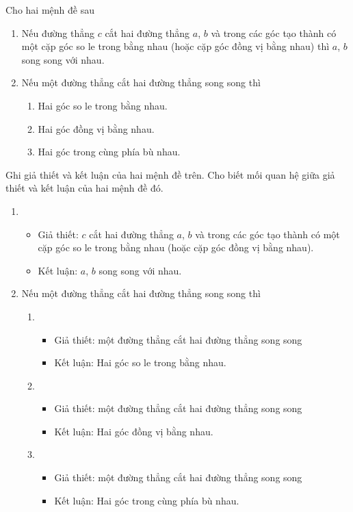 \begin{bt}%
Cho hai mệnh đề sau
	\begin{enumerate}
		\item Nếu đường thẳng $c$ cắt hai đường thẳng $a$, $b$ và trong các góc tạo thành có một cặp góc so le trong bằng nhau (hoặc cặp góc đồng vị bằng nhau) thì $a$, $b$ song song với nhau.
		\item Nếu một đường thẳng cắt hai đường thẳng song song thì 
			\begin{enumerate}[1.]
				\item Hai góc so le trong bằng nhau.
				\item Hai góc đồng vị  bằng nhau.
				\item Hai góc trong cùng phía bù nhau.
			\end{enumerate}
	\end{enumerate}
Ghi giả thiết và kết luận của hai mệnh đề trên. Cho biết mối quan hệ giữa  giả thiết và kết luận của hai mệnh đề đó.
	\loigiai
	{\begin{enumerate}
			\item 
			\begin{itemize}
			\item  Giả thiết: $c$ cắt hai đường thẳng $a$, $b$ và trong các góc tạo thành có một cặp góc so le trong bằng nhau (hoặc cặp góc đồng vị bằng nhau).
			\item Kết luận: $a$, $b$ song song với nhau. 
			\end{itemize}
			\item Nếu  một đường thẳng cắt hai đường thẳng song song thì 
			\begin{enumerate}[1.]
				\item 	
				\begin{itemize}
					\item  Giả thiết: một đường thẳng cắt hai đường thẳng song song 
					\item Kết luận: Hai góc so le trong bằng nhau.
				\end{itemize}
				\item 	
				\begin{itemize}
					\item  Giả thiết: một đường thẳng cắt hai đường thẳng song song 
					\item Kết luận: Hai góc đồng vị  bằng nhau.
				\end{itemize}
				\item 	
				\begin{itemize}
						\item  Giả thiết: một đường thẳng cắt hai đường thẳng song song 
					\item Kết luận: Hai góc trong cùng phía bù nhau.
				\end{itemize}
			\end{enumerate}
		\end{enumerate}
	}
\end{bt}


